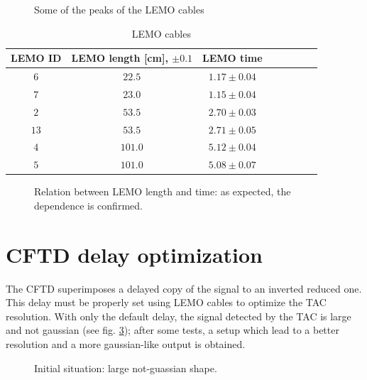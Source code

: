 \documentclass[11pt,a4 paper]{article}
\begin{document}
\begin{figure}[H]
    \centering
    \caption{Some of the peaks of the LEMO cables}
    \label{fig:lemo}
\end{figure}

\begin{table}[H]
    \centering
    \begin{tabular}{cccccccc}
        \toprule
        LEMO ID & LEMO length [cm], $\pm 0.1$ & LEMO time \\
        \midrule
        $6$ & $22.5$ & $1.17\pm0.04$\\
        $7$ & $23.0$ & $1.15\pm0.04$\\
        $2$ & $53.5$ & $2.70\pm0.03$\\
        $13$ & $53.5$ & $2.71\pm0.05$\\
        $4$ & $101.0$ & $5.12\pm0.04$\\
        $5$ & $101.0$ & $5.08\pm0.07$\\
        \bottomrule
    \end{tabular}
    \caption{LEMO cables}
    \label{tab:lemo}
\end{table}

\begin{figure}[H]
    \centering
    \caption{Relation between LEMO length and time: as expected, the dependence is confirmed.}
    \label{fig:lemo_length}
\end{figure}


\section{CFTD delay optimization}

The CFTD superimposes a delayed copy of the signal to an inverted reduced one. This delay must be properly set using LEMO cables to optimize the TAC resolution. With only the default delay, the signal detected by the TAC is large and not gaussian (see fig. \ref{fig:delay:bad}); after some tests, a setup which lead to a better resolution and a more gaussian-like output is obtained.

\begin{figure}[H]
    \centering
    \caption{Initial situation: large not-guassian shape.}
    \label{fig:delay:bad}
\end{figure}
\end{document}
